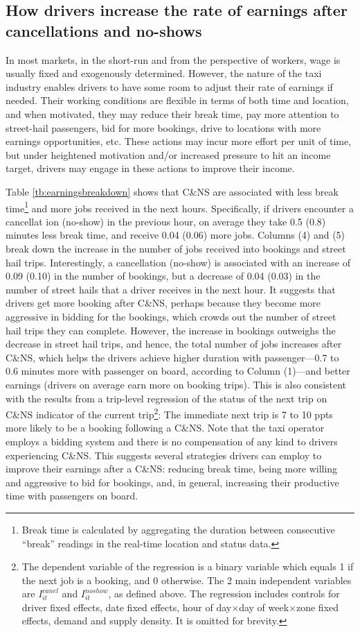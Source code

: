 \documentclass[reviewmode,AEJ]{AEA}
\begin{document}
\subsection{How drivers increase the rate of earnings after cancellations and no-shows}
In most markets, in the short-run and from the perspective of workers, wage is usually fixed and exogenously
determined. However, the nature of the taxi industry enables drivers to have some room to adjust their rate 
of earnings if needed. Their working conditions are flexible in terms of both time and location, and when
motivated, they may reduce their break time, pay more attention to street-hail passengers, bid for more bookings,
drive to locations with more earnings opportunities, etc. These actions may incur more effort per unit of
time, but under heightened motivation and/or increased pressure to hit an income target, drivers may engage 
in these actions to improve their income.

Table \ref{tb:earningsbreakdown} shows that C\&NS are associated with less break time\footnote{Break time
is calculated by aggregating the duration between consecutive ``break'' readings in the real-time location
and status data.} and more jobs received in the next hours. Specifically, if drivers encounter a cancellat
ion (no-show) in the previous hour, on average they take 0.5 (0.8) minutes less break time, and receive 0.04 
(0.06) more jobs. Columns (4) and (5) break down the increase in the number of jobs received into bookings and
street hail trips. Interestingly, a cancellation (no-show) is associated with an increase of 0.09 (0.10) in the
number of bookings, but a decrease of 0.04 (0.03) in the number of street hails that a driver receives in the
next hour. It suggests that drivers get more booking after C\&NS, perhaps because they become more aggressive
in bidding for the bookings, which crowds out the number of street hail trips they can complete. 
However, the increase in bookings outweighs the decrease in street hail trips, and hence, the total number
of jobs increases after C\&NS, which helps the drivers achieve higher duration with passenger---0.7 to 0.6
minutes more with passenger on board, according to Column (1)---and better earnings (drivers on average 
earn more on booking trips). This is also consistent with the results from a trip-level regression of the 
status of the next trip on C\&NS indicator of the current trip\footnote{The dependent variable of the 
regression is a binary variable which equals 1 if the next job is a booking, and 0 otherwise. 
The 2 main independent variables are $I_{it}^{canel}$ and $I_{it}^{noshow}$, as defined above.
The regression includes controls for driver fixed effects, date fixed effects, hour of day\(\times\)day 
of week\(\times\)zone fixed effects, demand and supply density. It is omitted for brevity.}: The immediate 
next trip is 7 to 10 ppts more likely to be a booking following a C\&NS. Note that the taxi operator employs 
a bidding system and there is no compensation of any kind to drivers experiencing C\&NS. 
This suggests several strategies drivers can employ to improve their earnings after a C\&NS: reducing
break time, being more willing and aggressive to bid for bookings, and, in general, increasing their 
productive time with passengers on board.
\end{document}
